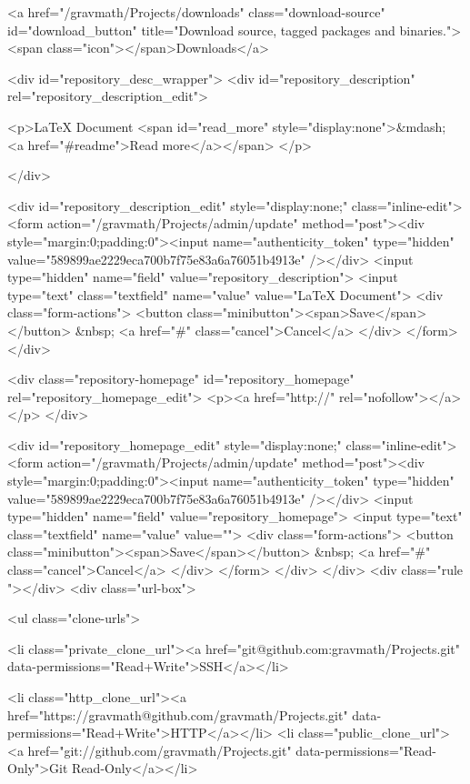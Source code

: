      
        <a href="/gravmath/Projects/downloads" class="download-source" id="download_button" title="Download source, tagged packages and binaries."><span class="icon"></span>Downloads</a>
      

      <div id="repository_desc_wrapper">
      <div id="repository_description" rel="repository_description_edit">
        
          <p>LaTeX Document
            <span id="read_more" style="display:none">&mdash; <a href="#readme">Read more</a></span>
          </p>
        
      </div>

      <div id="repository_description_edit" style="display:none;" class="inline-edit">
        <form action="/gravmath/Projects/admin/update" method="post"><div style="margin:0;padding:0"><input name="authenticity_token" type="hidden" value="589899ae2229eca700b7f75e83a6a76051b4913e" /></div>
          <input type="hidden" name="field" value="repository_description">
          <input type="text" class="textfield" name="value" value="LaTeX Document">
          <div class="form-actions">
            <button class="minibutton"><span>Save</span></button> &nbsp; <a href="#" class="cancel">Cancel</a>
          </div>
        </form>
      </div>

      
      <div class="repository-homepage" id="repository_homepage" rel="repository_homepage_edit">
        <p><a href="http://" rel="nofollow"></a></p>
      </div>

      <div id="repository_homepage_edit" style="display:none;" class="inline-edit">
        <form action="/gravmath/Projects/admin/update" method="post"><div style="margin:0;padding:0"><input name="authenticity_token" type="hidden" value="589899ae2229eca700b7f75e83a6a76051b4913e" /></div>
          <input type="hidden" name="field" value="repository_homepage">
          <input type="text" class="textfield" name="value" value="">
          <div class="form-actions">
            <button class="minibutton"><span>Save</span></button> &nbsp; <a href="#" class="cancel">Cancel</a>
          </div>
        </form>
      </div>
      </div>
      <div class="rule "></div>
      <div class="url-box">
  

  <ul class="clone-urls">
    
      
        <li class="private_clone_url"><a href="git@github.com:gravmath/Projects.git" data-permissions="Read+Write">SSH</a></li>
      
      <li class="http_clone_url"><a href="https://gravmath@github.com/gravmath/Projects.git" data-permissions="Read+Write">HTTP</a></li>
      <li class="public_clone_url"><a href="git://github.com/gravmath/Projects.git" data-permissions="Read-Only">Git Read-Only</a></li>
    

